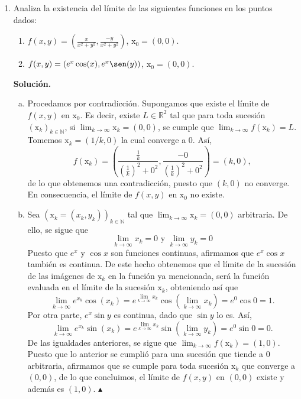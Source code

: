 \documentclass[12pt]{article}
\newcommand{\N}{\mathbb N}
\newcommand{\R}{\mathbb R}
\newcommand{\x}{\mathrm x}
\begin{document}
\begin{enumerate}
    \newpage
    \item Analiza la existencia del l\'imite de las siguientes funciones en los puntos dados:
        \begin{enumerate}[(1)]
            \item $\displaystyle{f(x,y) = \left( \frac{x}{x^2+y^2},\frac{-y}{x^2+y^2} \right)}$, 
                $\x_0=(0,0)$.
            \item $f(x,y) = (e^x\cos(x),e^x\sen(y))$, $\x_0=(0,0)$.
        \end{enumerate} 
    \textbf{Solución.}
    \begin{enumerate}[(a)]
        \item Procedamos por contradicción. Supongamos que existe el límite de $f(x,y)$ en $\x_0$. Es decir, existe $L \in \R^2$ tal que para toda sucesión $(\x_k)_{k\in \N}$, si $\lim_{k\to \infty}\x_k=(0,0)$, se cumple que $\lim_{k\to \infty}f(\x_k)=L$.
            Tomemos $\x_k=(1/k,0)$ la cual converge a 0. Así,
            \[
                f(\x_k) = \left(\frac{\frac{1}{k}}{\left(\frac{1}{k}\right)^2+0^2},\frac{-0}{\left(\frac{1}{k}\right)^2+0^2}\right)=(k,0),
            \]
            de lo que obtenemos una contradicción, puesto que $(k,0)$ no converge. En consecuencia, el límite de $f(x,y)$ en $\x_0$ no existe.
        \item Sea $(\x_k=(x_k,y_k))_{k\in \N}$ tal que $\lim_{k\to \infty}\x_k=(0,0)$ arbitraria. De ello, se sigue que
            \[
                \lim_{k\to \infty}x_k=0 \text{ y } \lim_{k\to \infty}y_k = 0
            \] 
            Puesto que $e^x$ y $\cos x$ son funciones continuas, afirmamos que $e^x\cos x$ también es continua.
            De este hecho obtenemos que el límite de la sucesión de las imágenes de $\x_k$ en la función ya mencionada, será la función evaluada en el límite de la sucesión $\x_k$, obteniendo así que 
            \[
                \lim_{k\to \infty}e^{x_k}\cos(x_k) = e^{\lim_{k\to \infty}x_k}\cos (\lim_{k\to \infty}x_k) = e^0\cos 0 = 1.
            \]
            Por otra parte, $e^x\sin y$ es continua, dado que $\sin y$ lo es. Así,
            \[
                \lim_{k\to \infty}e^{x_k}\sin(x_k) = e^{\lim_{k\to \infty}x_k}\sin(\lim_{k\to \infty}y_k) = e^0\sin 0 = 0.
            \]
            De las igualdades anteriores, se sigue que $\lim_{k\to \infty}f(\x_k)=(1,0)$. Puesto que lo anterior se cumplió para una sucesión que tiende a 0 arbitraria, afirmamos que se cumple para toda sucesión $\x_k$ que converge a $(0,0)$, de lo que concluimos, el límite de $f(x,y)$
            en $(0,0)$ existe y además es $(1,0)$. \hfill $\blacktriangle$
    \end{enumerate}


\end{enumerate}
\end{document}
